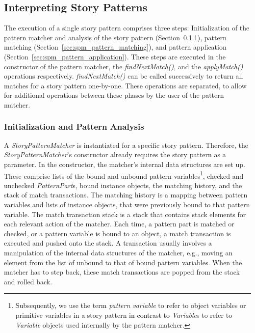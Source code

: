 \subsection{Interpreting Story Patterns}
\label{sec:interpreting_story_patterns}

The execution of a single story pattern comprises three steps:
Initialization of the pattern matcher and analysis of the story pattern (Section~\ref{sec:spm_initialization}),
pattern matching (Section~\ref{sec:spm_pattern_matching}),
and pattern application (Section~\ref{sec:spm_pattern_application}).
These steps are executed in the constructor of the pattern matcher, the \emph{findNextMatch()}, and the \emph{applyMatch()} operations respectively.
\emph{findNextMatch()} can be called successively to return all matches for a story pattern one-by-one.
These operations are separated, to allow for additional operations between these phases by the user of the pattern matcher.


\subsubsection{Initialization and Pattern Analysis}
\label{sec:spm_initialization}

A \emph{StoryPatternMatcher} is instantiated for a specific story pattern. 
Therefore, the \emph{StoryPatternMatcher}'s constructor already requires the story pattern as a parameter.
In the constructor, the matcher's internal data structures are set up. 
These comprise lists of the bound and unbound pattern variables\footnote{Subsequently, we use the term \emph{pattern variable} to refer to object variables or primitive variables in a story pattern in contrast to \emph{Variable}s to refer to \emph{Variable} objects used internally by the pattern matcher.}, checked and unchecked \emph{PatternPart}s, bound instance objects, the matching history, and the stack of match transactions.
The matching history is a mapping between pattern variables and lists of instance objects, that were previously bound to that pattern variable.
The match transaction stack is a stack that contains stack elements for each relevant action of the matcher.
Each time, a pattern part is matched or checked, or a pattern variable is bound to an object, a match transaction is executed and pushed onto the stack.
A transaction usually involves a manipulation of the internal data structures of the matcher, e.g., moving an element from the list of unbound to that of bound pattern variables.
When the matcher has to step back, these match transactions are popped from the stack and rolled back.

